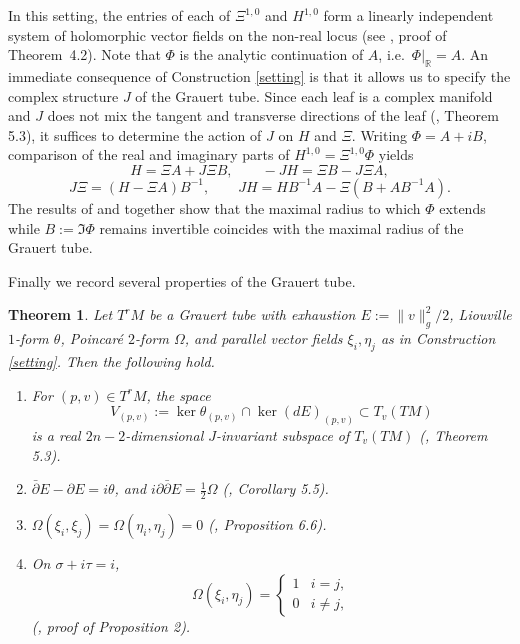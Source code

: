 \documentclass[a4paper, 12pt]{article}
\newcommand{\idd}{i\partial\bar\partial}
\newtheorem{thm}{Theorem}[section]
\begin{document}
In this setting, the entries of each of $\Xi^{1,0}$ and $H^{1,0}$ form a linearly independent system of holomorphic vector fields on the non-real locus (see \cite{LS91}, proof of Theorem~4.2). Note that $\Phi$ is the analytic continuation of $A$, i.e.\ $\Phi|_{\mathbb{R}}=A$. An immediate consequence of Construction \ref{setting} is that it allows us to specify the complex structure $J$ of the Grauert tube. Since each leaf is a complex manifold and $J$ does not mix the tangent and transverse directions of the leaf (\cite{LS91}, Theorem 5.3), it suffices to determine the action of $J$ on $H$ and $\Xi$. Writing $\Phi=A+iB$, comparison of the real and imaginary parts of $H^{1,0}=\Xi^{1,0}\Phi$ yields
\[
H=\Xi A+J\Xi B, \qquad -JH=\Xi B-J\Xi A,
\]
\begin{equation}\label{J}
J\Xi=(H-\Xi A) B^{-1}, \qquad
JH=H B^{-1} A-\Xi(B+A B^{-1} A).
\end{equation}
The results of \cite{S91} and \cite{LS91} together show that the maximal radius to which $\Phi$ extends while $B:=\Im\Phi$ remains invertible coincides with the maximal radius of the Grauert tube.

Finally we record several properties of the Grauert tube.

\begin{thm}\label{egtprop}
Let $T^rM$ be a Grauert tube with exhaustion $E:=\|v\|_g^2/2$, Liouville $1$-form $\theta$, Poincar\'e $2$-form $\Omega$, and parallel vector fields $\xi_i,\eta_j$ as in Construction \ref{setting}. Then the following hold.
\begin{enumerate}
\item For $(p,v)\in T^rM$, the space
\[
V_{(p,v)}:=\ker\theta_{(p,v)}\cap\ker(dE)_{(p,v)}\subset T_v(TM)
\]
is a real $2n-2$-dimensional $J$-invariant subspace of $T_v(TM)$ (\cite{LS91}, Theorem 5.3).
\item $\bar\partial E-\partial E=i\theta$, and $\idd E=\frac12\Omega$ (\cite{LS91}, Corollary 5.5).
\item $\Omega(\xi_i,\xi_j)=\Omega(\eta_i,\eta_j)=0$ (\cite{LS91}, Proposition 6.6).
\item On $\sigma+i\tau=i$,
\[
\Omega(\xi_i,\eta_j)=
\begin{cases}
1 & i=j,\\
0 & i\neq j,
\end{cases}
\]
(\cite{BL18}, proof of Proposition 2).
\end{enumerate}
\end{thm}
\end{document}
